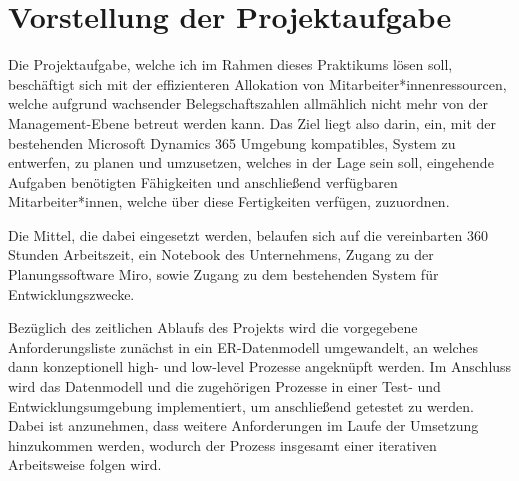 \section{Vorstellung der Projektaufgabe}
\label{sec:VorstAufgabe}

Die Projektaufgabe, welche ich im Rahmen dieses Praktikums lösen soll, beschäftigt sich mit der effizienteren Allokation von Mitarbeiter*innenressourcen, welche aufgrund wachsender Belegschaftszahlen allmählich nicht mehr von der Management-Ebene betreut werden kann. Das Ziel liegt also darin, ein, mit der bestehenden Microsoft Dynamics 365 Umgebung kompatibles, System zu entwerfen, zu planen und umzusetzen, welches in der Lage sein soll, eingehende Aufgaben benötigten Fähigkeiten und anschließend verfügbaren Mitarbeiter*innen, welche über diese Fertigkeiten verfügen, zuzuordnen.

Die Mittel, die dabei eingesetzt werden, belaufen sich auf die vereinbarten 360 Stunden Arbeitszeit, ein Notebook des Unternehmens, Zugang zu der Planungssoftware Miro, sowie Zugang zu dem bestehenden System für Entwicklungszwecke.

Bezüglich des zeitlichen Ablaufs des Projekts wird die vorgegebene Anforderungsliste zunächst in ein ER-Datenmodell umgewandelt, an welches dann konzeptionell high- und low-level Prozesse angeknüpft werden. Im Anschluss wird das Datenmodell und die zugehörigen Prozesse in einer Test- und Entwicklungsumgebung implementiert, um anschließend getestet zu werden. Dabei ist anzunehmen, dass weitere Anforderungen im Laufe der Umsetzung hinzukommen werden, wodurch der Prozess insgesamt einer iterativen Arbeitsweise folgen wird.